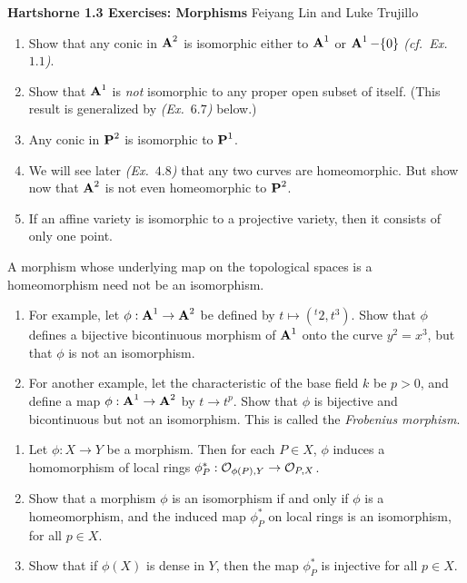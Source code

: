 \documentclass[10pt]{amsart}
\newcommand{\header}[2]{
    {\noindent
    {\Large \bf Hartshorne #1 Exercises: #2}
    \hfill 
    {\large Feiyang Lin and Luke Trujillo}
    \vspace{0.5cm}}
}
\begin{document}
\header{1.3}{Morphisms}

\begin{exercise}[3.1]
    \begin{enumerate}[itemsep=2pt]
    \item Show that any conic in $\aa^2$ is isomorphic either to $\aa^1$ or
        $\aa^1 - \{0\}$ \emph{(cf.\ Ex.~$1.1$)}.
    \item Show that $\aa^1$ is \emph{not} isomorphic to any proper open subset
        of itself. (This result is generalized by \emph{(Ex.~$6.7$)} below.)
    \item Any conic in $\pp^2$ is isomorphic to $\pp^1$.
    \item We will see later \emph{(Ex.\ $4.8$)} that any two curves are
        homeomorphic. But show now that $\aa^2$ is not even homeomorphic to
        $\pp^2$.
    \item If an affine variety is isomorphic to a projective variety, then it
        consists of only one point.
    \end{enumerate}
\end{exercise}


\begin{exercise}[3.2]
    A morphism whose underlying map on the topological spaces 
    is a homeomorphism need not be an isomorphism.
    \begin{enumerate}[itemsep=2pt]
        \item For example, let $\phi : \aa^1  \to \aa^2$ be defined by 
        $t \mapsto (^t2,t^3)$. Show that $\phi$ defines a
        bijective bicontinuous morphism of $\aa^1$ onto the curve $y^2 = x^3$, 
        but that $\phi$ is not an isomorphism.

        \item For another example, let the characteristic of the base field $k$ be $p > 0$, and
        define a map $\phi : \aa^1 \to \aa^2$ by $t \to t^p$. Show that $\phi$ 
        is bijective and bicontinuous but not an isomorphism. 
        This is called the \emph{Frobenius morphism}.
    \end{enumerate}
\end{exercise}


\begin{exercise}[3.3]
    \begin{enumerate}[itemsep=2pt]
        \item 
        Let $\phi:X \to Y$ be a morphism. Then for each $P \in X$, $\phi$ 
        induces a homomorphism of local rings 
        $\phi_P^*: \cO_{\phi(P), Y} \to \cO_{P, X}$.

        \item Show that a morphism $\phi$ is an isomorphism if and only if $\phi$ is a 
        homeomorphism, and the induced map $\phi_P^*$ on local rings 
        is an isomorphism, for all $p \in X$. 

        \item Show that if $\phi(X)$ is dense in $Y$, 
        then the map $\phi_P^*$ is injective for all $p \in X$.
    \end{enumerate}
    
\end{exercise}
\end{document}
